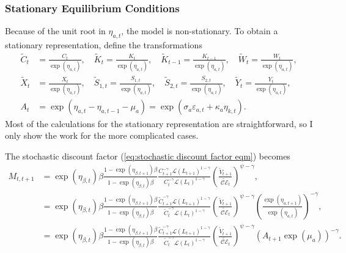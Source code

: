 \documentclass[12 pt, oneside]{article}
\theoremstyle{definition}
\theoremstyle{definition}
\theoremstyle{definition}
\newcommand{\calC}{\mathcal{C}}
\newcommand{\calE}{\mathcal{E}}
\newcommand{\calL}{\mathcal{L}}
\begin{document}
\subsubsection{Stationary Equilibrium Conditions}
Because of the unit root in $\eta_{a, t}$, the model is non-stationary. To obtain a stationary representation, define the transformations
\begin{align}
  \tilde{C}_t & = \frac{C_t}{\exp(\eta_{a, t})}, \quad \tilde{K}_t = \frac{K_t}{\exp(\eta_{a, t})}, \quad  \tilde{K}_{t - 1} = \frac{K_{t - 1}}{\exp(\eta_{a, t})}, \quad \tilde{W}_t = \frac{W_t}{\exp(\eta_{a, t})},\\
\tilde{X}_t & = \frac{X_t}{\exp(\eta_{a, t})}, \quad \tilde{S}_{1, t} = \frac{S_{1, t}}{\exp(\eta_{a, t})}, \quad \tilde{S}_{2, t} = \frac{S_{2, t}}{\exp(\eta_{a, t})}, \quad \tilde{Y}_t = \frac{Y_t}{\exp(\eta_{a, t})},\\
  A_t & = \exp(\eta_{a, t} - \eta_{a, t - 1} - \mu_a) = \exp(\sigma_a\varepsilon_{a, t} + \kappa_a\eta_{k, t}).
\end{align}
Most of the calculations for the stationary representation are straightforward, so I only show the work for the more complicated cases.

The stochastic discount factor (\ref{eq:stochastic discount factor eqm}) becomes
\begin{align*}
  M_{t, t + 1} & = \exp(\eta_{\beta, t})\beta\frac{1 - \exp(\eta_{\beta, t + 1})\beta}{1 - \exp(\eta_{\beta, t})\beta} \frac{C_{t + 1}^{- \gamma } \calL(L_{t + 1})^{1 - \gamma}}{C_t^{-\gamma} \calL(L_t)^{1 - \gamma}}\left(\frac{\tilde{V}_{t + 1}}{\tilde{\calC\calE}_t}\right)^{ \psi - \gamma},\\
               & = \exp(\eta_{\beta, t})\beta\frac{1 - \exp(\eta_{\beta, t + 1})\beta}{1 - \exp(\eta_{\beta, t})\beta} \frac{\tilde{C}_{t + 1}^{- \gamma } \calL(L_{t + 1})^{1 - \gamma}}{\tilde{C}_t^{-\gamma} \calL(L_t)^{1 - \gamma}}\left(\frac{\tilde{V}_{t + 1}}{\tilde{\calC\calE}_t}\right)^{ \psi - \gamma}\left(\frac{\exp(\eta_{a, t + 1})}{\exp(\eta_{a, t})}\right)^{-\gamma},\\
               & = \exp(\eta_{\beta, t})\beta\frac{1 - \exp(\eta_{\beta, t + 1})\beta}{1 - \exp(\eta_{\beta, t})\beta} \frac{\tilde{C}_{t + 1}^{- \gamma } \calL(L_{t + 1})^{1 - \gamma}}{\tilde{C}_t^{-\gamma} \calL(L_t)^{1 - \gamma}}\left(\frac{\tilde{V}_{t + 1}}{\tilde{\calC\calE}_t}\right)^{ \psi - \gamma}\left(A_{t + 1}\exp(\mu_a)\right)^{-\gamma}.
\end{align*}
\end{document}

